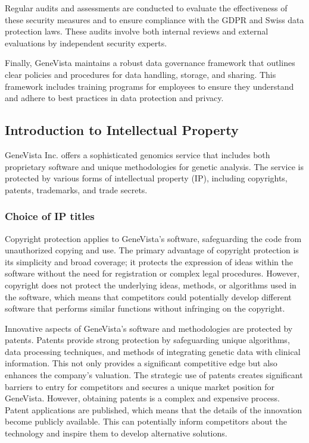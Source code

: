\documentclass[a4paper]{article}
\begin{document}
Regular audits and assessments are conducted to evaluate the effectiveness of these security measures and to ensure compliance with the GDPR and Swiss data protection laws. These audits involve both internal reviews and external evaluations by independent security experts.

Finally, GeneVista maintains a robust data governance framework that outlines clear policies and procedures for data handling, storage, and sharing. This framework includes training programs for employees to ensure they understand and adhere to best practices in data protection and privacy.

\subsection{Introduction to Intellectual Property}

GeneVista Inc. offers a sophisticated genomics service that includes both proprietary software and unique methodologies for genetic analysis. The service is protected by various forms of intellectual property (IP), including copyrights, patents, trademarks, and trade secrets. 

\subsubsection{Choice of IP titles}

Copyright protection applies to GeneVista’s software, safeguarding the code from unauthorized copying and use. The primary advantage of copyright protection is its simplicity and broad coverage; it protects the expression of ideas within the software without the need for registration or complex legal procedures. However, copyright does not protect the underlying ideas, methods, or algorithms used in the software, which means that competitors could potentially develop different software that performs similar functions without infringing on the copyright.

Innovative aspects of GeneVista's software and methodologies are protected by patents. Patents provide strong protection by safeguarding unique algorithms, data processing techniques, and methods of integrating genetic data with clinical information. This not only provides a significant competitive edge but also enhances the company’s valuation. The strategic use of patents creates significant barriers to entry for competitors and secures a unique market position for GeneVista. However, obtaining patents is a complex and expensive process. Patent applications are published, which means that the details of the innovation become publicly available. This can potentially inform competitors about the technology and inspire them to develop alternative solutions.
\end{document}
